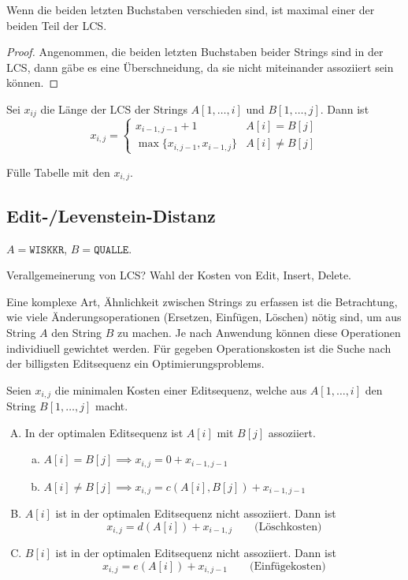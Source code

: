 \documentclass{mycourse}
\begin{document}
\begin{st}
	Wenn die beiden letzten Buchstaben verschieden sind, ist maximal einer der beiden Teil der LCS.
	\begin{proof}
		Angenommen, die beiden letzten Buchstaben beider Strings sind in der LCS, dann gäbe es eine Überschneidung, da sie nicht miteinander assoziiert sein können.
	\end{proof}
\end{st}

\begin{st}
	Sei $x_{ij}$ die Länge der LCS der Strings $A[1,\dotsc,i]$ und $B[1,\dotsc,j]$.
	Dann ist
	\[
		x_{i,j} = \begin{cases}
			x_{i-1,j-1} + 1 			& A[i] = B[j] \\
			\max\{x_{i,j-1}, x_{i-1,j}\} & A[i] \neq B[j]
		\end{cases}
	\]
\end{st}

\begin{note}
	Fülle Tabelle mit den $x_{i,j}$.
\end{note}


\subsection{Edit-/Levenstein-Distanz}


\begin{ex}
	$A = \texttt{WISKKR}$, $B = \texttt{QUALLE}$.
\end{ex}
Verallgemeinerung von LCS? Wahl der Kosten von Edit, Insert, Delete.

Eine komplexe Art, Ähnlichkeit zwischen Strings zu erfassen ist die Betrachtung, wie viele Änderungsoperationen (Ersetzen, Einfügen, Löschen) nötig sind, um aus String $A$ den String $B$ zu machen.
Je nach Anwendung können diese Operationen individiuell gewichtet werden.
Für gegeben Operationskosten ist die Suche nach der billigsten Editsequenz ein Optimierungsproblems.

Seien $x_{i,j}$ die minimalen Kosten einer Editsequenz, welche aus $A[1,\dotsc,i]$ den String $B[1,\dotsc,j]$ macht.

\begin{enumerate}[A)]
	\item
		In der optimalen Editsequenz ist $A[i]$ mit $B[j]$ assoziiert.
		\begin{enumerate}[a)]
			\item
				$A[i] = B[j] \implies x_{i,j} = 0 + x_{i-1,j-1}$
			\item
				$A[i] \neq B[j] \implies x_{i,j} = c(A[i], B[j]) + x_{i-1,j-1}$
		\end{enumerate}
	\item
		$A[i]$ ist in der optimalen Editsequenz nicht assoziiert.
		Dann ist
		\[
			x_{i,j} = d(A[i]) + x_{i-1,j} \qquad \text{(Löschkosten)}
		\]
	\item
		$B[i]$ ist in der optimalen Editsequenz nicht assoziiert.
		Dann ist
		\[
			x_{i,j} = e(A[i]) + x_{i,j-1} \qquad \text{(Einfügekosten)}
		\]
\end{enumerate}
\end{document}
